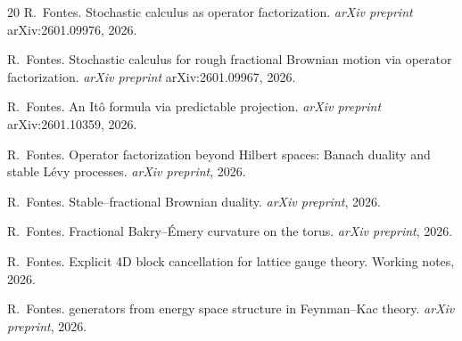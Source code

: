 \documentclass[11pt,a4paper]{article}
\theoremstyle{plain}
\theoremstyle{definition}
\theoremstyle{remark}
\begin{document}
\begin{thebibliography}{20}
R.~Fontes.
\newblock Stochastic calculus as operator factorization.
\newblock \emph{arXiv preprint} arXiv:2601.09976, 2026.

R.~Fontes.
\newblock Stochastic calculus for rough fractional {B}rownian motion
  via operator factorization.
\newblock \emph{arXiv preprint} arXiv:2601.09967, 2026.

R.~Fontes.
\newblock An {I}t\^o formula via predictable projection.
\newblock \emph{arXiv preprint} arXiv:2601.10359, 2026.

R.~Fontes.
\newblock Operator factorization beyond {H}ilbert spaces: {B}anach
  duality and stable {L}\'evy processes.
\newblock \emph{arXiv preprint}, 2026.

R.~Fontes.
\newblock Stable--fractional {B}rownian duality.
\newblock \emph{arXiv preprint}, 2026.

R.~Fontes.
\newblock Fractional {B}akry--\'Emery curvature on the torus.
\newblock \emph{arXiv preprint}, 2026.

R.~Fontes.
\newblock Explicit 4{D} block cancellation for lattice gauge theory.
\newblock Working notes, 2026.

R.~Fontes.
 generators from energy space structure in {F}eynman--{K}ac theory.
\newblock \emph{arXiv preprint}, 2026.

\end{thebibliography}
\end{document}
